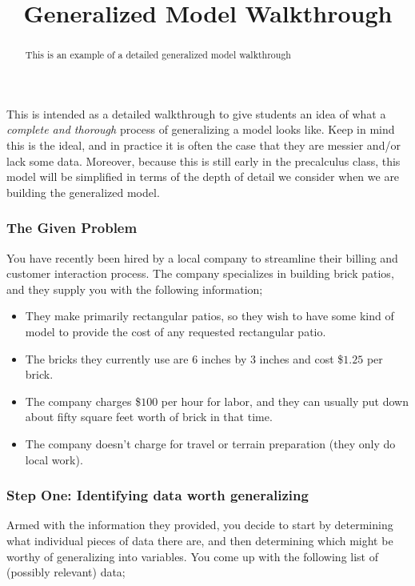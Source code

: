 \documentclass{ximera}
\title{Generalized Model Walkthrough}
\begin{document}
\begin{abstract}
    This is an example of a detailed generalized model walkthrough
\end{abstract}
\maketitle

\begin{example}

    This is intended as a detailed walkthrough to give students an idea of what a \textit{complete and thorough} process of generalizing a model looks like. Keep in mind this is the ideal, and in practice it is often the case that they are messier and/or lack some data. Moreover, because this is still early in the precalculus class, this model will be simplified in terms of the depth of detail we consider when we are building the generalized model.
    
    \subsubsection*{The Given Problem}
        You have recently been hired by a local company to streamline their billing and customer interaction process. The company specializes in building brick patios, and they supply you with the following information;
        
        \begin{itemize}
            \item They make primarily rectangular patios, so they wish to have some kind of model to provide the cost of any requested rectangular patio.
            \item The bricks they currently use are 6 inches by 3 inches and cost \$$1.25$ per brick.
            \item The company charges \$$100$ per hour for labor, and they can usually put down about fifty square feet worth of brick in that time.
            \item The company doesn't charge for travel or terrain preparation (they only do local work).
        \end{itemize}
    
    \subsubsection*{Step One: Identifying data worth generalizing}
    
        Armed with the information they provided, you decide to start by determining what individual pieces of data there are, and then determining which might be worthy of generalizing into variables. You come up with the following list of (possibly relevant) data;
        

\end{example}
\end{document}
